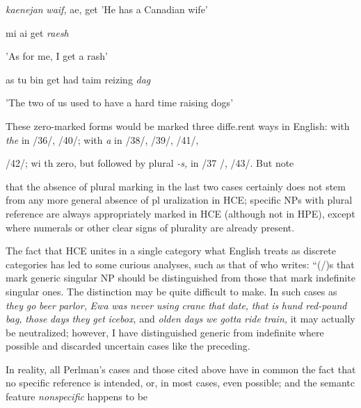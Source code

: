 \ea\label{ex:41}
 \textit{kaenejan} \textit{waif,} ae, get 'He has a Canadian wife'
\glt
\z

\ea\label{ex:42}
 mi ai get \textit{raesh}
\glt
\z

'As for me, I get a rash'

\ea\label{ex:43}
 as tu bin get had taim reizing \textit{dag}
\glt
\z

'The two of us used to have a hard time raising dogs'

These zero-marked forms would be marked three diffe.rent ways in English: with \textit{the }in /36/, /40/; with \textit{a} in /38/, /39/, /41/,

/42/; wi th zero, but followed by plural \textit{{}-s, }in /37 /, /43/. But note

that the absence of plural marking in the last two cases certainly does not stem from any more general absence of pl uralization in HCE; specific NPs with plural reference are always appropriately marked in HCE (although not in HPE), except where numerals or other clear signs of plurality are already present.

The fact that HCE unites in a single category what English treats as discrete categories has led to some curious analyses, such as that of \citet[99]{Perlman1973} who writes: ``(/)s that mark generic singular NP should be distinguished from those that mark indefinite singular ones. The distinction may be quite difficult to make. In such cases as \textit{they} \textit{go} \textit{beer} \textit{parlor,} \textit{Ewa} \textit{was} \textit{never} \textit{using} \textit{crane} \textit{that} \textit{date,} \textit{that} \textit{is} \textit{hund} \textit{red-pound} \textit{bag,} \textit{those }\textit{d}\textit{ays} \textit{they} \textit{get} \textit{icebox,} and \textit{olden} \textit{days} \textit{we} \textit{gotta} \textit{ride} \textit{train,} it may actually be neutralized; however, I have dis\-tinguished generic from indefinite where possible and discarded un\-certain cases like the preceding.{\textquotedbl}

In reality, all Perlman's cases and those cited above have in common the fact that no specific reference is intended, or, in most cases, even possible; and the semantc feature \textit{nonspecific} happens to be


